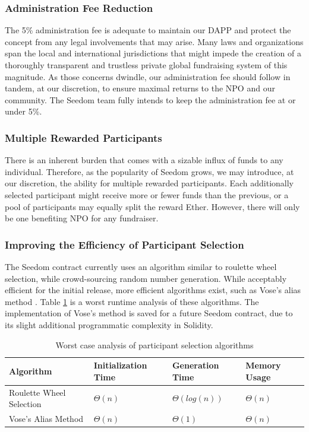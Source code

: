 \documentclass[11pt]{article}
\begin{document}
\subsubsection{Administration Fee Reduction}

The 5\% administration fee is adequate to maintain our DAPP and protect the concept from any legal involvements that may arise. Many laws and organizations span the local and international jurisdictions that might impede the creation of a thoroughly transparent and trustless private global fundraising system of this magnitude. As those concerns dwindle, our administration fee should follow in tandem, at our discretion, to ensure maximal returns to the NPO and our community. The Seedom team fully intends to keep the administration fee at or under 5\%.

\subsubsection{Multiple Rewarded Participants}

There is an inherent burden that comes with a sizable influx of funds to any individual. Therefore, as the popularity of Seedom grows, we may introduce, at our discretion, the ability for multiple rewarded participants. Each additionally selected participant might receive more or fewer funds than the previous, or a pool of participants may equally split the reward Ether. However, there will only be one benefiting NPO for any fundraiser.

\subsubsection{Improving the Efficiency of Participant Selection}
\label{sec:improvingTheEfficiencyOfParticipantSelection}

The Seedom contract currently uses an algorithm similar to roulette wheel selection, while crowd-sourcing random number generation. While acceptably efficient for the initial release, more efficient algorithms exist, such as Vose's alias method \cite{8}. Table \ref{tab:worstCaseAnalysisOfParticipantSelectionAlgorithms} is a worst runtime analysis of these algorithms. The implementation of Vose's method is saved for a future Seedom contract, due to its slight additional programmatic complexity in Solidity.

\begin{table}[H]
\begin{center}
\begin{tabular}{| l | l | l | l |}
\hline
\textbf{Algorithm} & \textbf{Initialization Time} & \textbf{Generation Time} & \textbf{Memory Usage} \\ \hline
Roulette Wheel Selection & $\Theta(n)$ & $\Theta(log(n))$ & $\Theta(n)$ \\ \hline
Vose's Alias Method & $\Theta(n)$ & $\Theta(1)$ & $\Theta(n)$ \\ \hline
\end{tabular}
\caption{Worst case analysis of participant selection algorithms}
\label{tab:worstCaseAnalysisOfParticipantSelectionAlgorithms}
\end{center}
\end{table}
\end{document}
